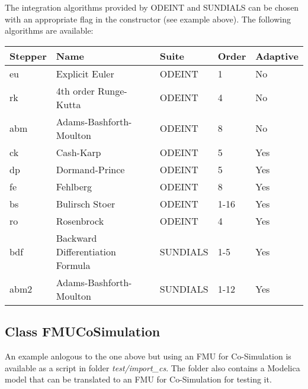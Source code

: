 The integration algorithms provided by ODEINT and SUNDIALS can be chosen with an appropriate flag in the constructor (see example above).
The following algorithms are available:

\begin{center}

\begin{tabular}{|l|l|l|l|l|}
\hline 
Stepper & Name & Suite & Order & Adaptive \\ 
\hline 
eu & Explicit Euler & ODEINT & 1 & No  \\ 
\hline 
rk & 4th order Runge-Kutta & ODEINT & 4 & No  \\ 
\hline 
abm & Adams-Bashforth-Moulton & ODEINT & 8 & No  \\ 
\hline 
ck & Cash-Karp & ODEINT & 5 & Yes  \\ 
\hline 
dp & Dormand-Prince & ODEINT & 5 & Yes  \\ 
\hline 
fe & Fehlberg & ODEINT & 8 & Yes  \\ 
\hline 
bs & Bulirsch Stoer & ODEINT & 1-16 & Yes  \\ 
\hline 
ro & Rosenbrock & ODEINT & 4 & Yes  \\ 
\hline 
bdf & Backward Differentiation Formula & SUNDIALS & 1-5 & Yes  \\ 
\hline 
abm2 & Adams-Bashforth-Moulton & SUNDIALS & 1-12 & Yes \\ 
\hline 
\end{tabular} 

\end{center}


\subsection{Class FMUCoSimulation}

An example anlogous to the one above but using an FMU for Co-Simulation is available as a \matlab script in folder \emph{test/import\_cs}.
The folder also contains a Modelica model that can be translated to an FMU for Co-Simulation for testing it.


